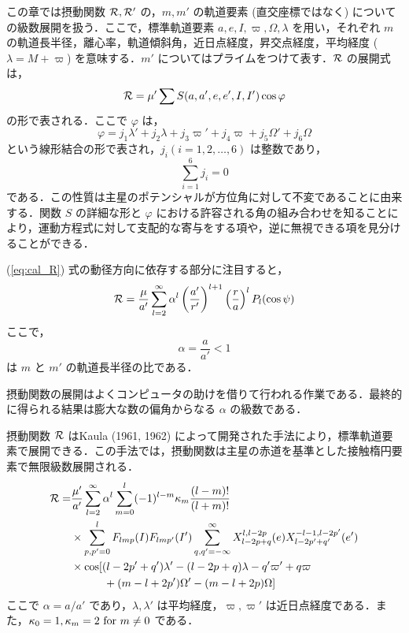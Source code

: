\documentclass[11pt,a4paper,oneside,onecolumn]{jarticle}
\begin{document}
この章では摂動関数 ${\cal R}, {\cal R'}$ の，$m, m'$ の軌道要素 (直交座標ではなく) についての級数展開を扱う．ここで，標準軌道要素 $a, e, I, \varpi, \Omega, \lambda$ を用い，それぞれ $m$ の軌道長半径，離心率，軌道傾斜角，近日点経度，昇交点経度，平均経度 ($\lambda = M + \varpi$) を意味する．$m'$ についてはプライムをつけて表す．${\cal R}$ の展開式は，
\begin{equation}
{\cal R} = \mu' \sum S (a,a',e,e',I,I') \cos \varphi
\end{equation}
の形で表される．ここで $\varphi$ は，
\begin{equation}
\varphi = j_1 \lambda' + j_2 \lambda + j_3 \varpi' + j_4 \varpi + j_5 \Omega' + j_6 \Omega
\end{equation}
という線形結合の形で表され，$j_i (i = 1,2,…,6)$ は整数であり，
\begin{equation}
\sum_{i = 1}^{6} j_i = 0
\end{equation}
である．この性質は主星のポテンシャルが方位角に対して不変であることに由来する．関数 $S$ の詳細な形と $\varphi$ における許容される角の組み合わせを知ることにより，運動方程式に対して支配的な寄与をする項や，逆に無視できる項を見分けることができる．

(\ref{eq:cal_R}) 式の動径方向に依存する部分に注目すると，
\begin{equation}
{\cal R} = \frac{\mu}{a'} \sum_{l = 2}^{\infty} \alpha^l \left( \frac{a'}{r'} \right)^{l+1} \left( \frac{r}{a} \right)^l P_l (\cos \psi)
\end{equation}
ここで，
\begin{equation}
\alpha = \frac{a}{a'} < 1
\end{equation}
は $m$ と $m'$ の軌道長半径の比である．

摂動関数の展開はよくコンピュータの助けを借りて行われる作業である．最終的に得られる結果は膨大な数の偏角からなる $\alpha$ の級数である．

摂動関数 ${\cal R}$ はKaula (1961, 1962) によって開発された手法により，標準軌道要素で展開できる．この手法では，摂動関数は主星の赤道を基準とした接触楕円要素で無限級数展開される．
\begin{equation}
\begin{split}
{\cal R} = & \frac{\mu'}{a'} \sum_{l = 2}^{\infty} \alpha^l \sum_{m = 0}^l (-1)^{l - m} \kappa_m \frac{(l - m) !}{(l + m) !} \\
& \times \sum_{p,p' = 0}^l F_{lmp} (I) F_{lmp'} (I') \sum_{q,q' = - \infty}^{\infty} X_{l - 2p + q}^{l, l - 2p} (e) X_{l - 2p' + q'}^{-l -1, l - 2p'} (e') \\
& \times \cos [ (l - 2p' + q') \lambda' - (l - 2p + q) \lambda - q' \varpi' + q \varpi \\
& \quad \quad \quad+ (m - l + 2p') \Omega' - (m - l + 2p) \Omega ]
\end{split}
\end{equation}
ここで $\alpha = a / a'$ であり，$\lambda, \lambda'$ は平均経度，$\varpi, \varpi'$ は近日点経度である．また，$\kappa_0 = 1, \kappa_m = 2 \ {\rm for} \ m \not = 0$ である．
\end{document}
